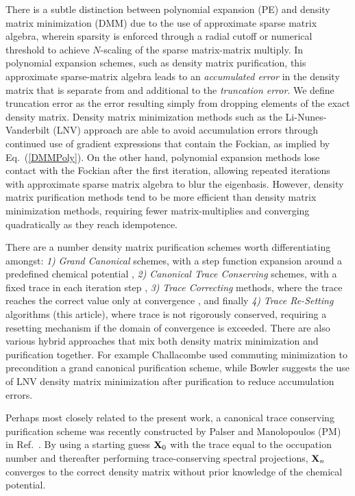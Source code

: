 \commentoutA{\documentclass[prl,aps,twocolumn,showpacs,twocolumngrid,superbib]{revtex4}}
\begin{document}
There is a subtle distinction between polynomial expansion (PE) and density 
matrix minimization (DMM) due to the use of approximate sparse matrix algebra, wherein
sparsity is enforced through a radial cutoff or numerical threshold  to 
achieve $N$-scaling of the sparse matrix-matrix multiply. In polynomial expansion schemes, 
such as density matrix purification, 
this approximate sparse-matrix algebra leads to an {\em accumulated error} in the density matrix 
that is separate from and additional to the {\em truncation error}.  We define truncation error as the 
error resulting simply from dropping elements of the exact density matrix.  Density matrix 
minimization methods such as the Li-Nunes-Vanderbilt \cite{XLi93,DBowler99} (LNV) approach are able to 
avoid accumulation errors through continued use of gradient expressions that contain the Fockian, 
as implied by Eq.~(\ref{DMMPoly}). On the other hand, polynomial expansion methods lose contact 
with the Fockian after the first iteration, allowing repeated iterations with 
approximate sparse matrix algebra to blur the eigenbasis.  However, density matrix purification 
methods tend to be more efficient than density matrix minimization methods, requiring fewer 
matrix-multiplies and converging quadratically as they reach idempotence.

There are a number density matrix purification schemes worth differentiating amongst: 
{\it 1)} {\it Grand Canonical} schemes, with a step function  expansion around a predefined 
         chemical potential \cite{RMcWeeny60,APalser99,AHolas01,ANiklasson02A,ANiklasson02B},
{\it 2)} {\it Canonical Trace Conserving} schemes, with a fixed trace
         in each iteration step \cite{APalser99}, 
{\it 3)} {\it Trace Correcting} methods, where the trace reaches the correct value only at 
         convergence \cite{ANiklasson02A}, and finally 
{\it 4)} {\it Trace Re-Setting} algorithms (this article), where trace is not rigorously conserved,
          requiring a resetting  mechanism if the domain of convergence is exceeded.
There are also various hybrid approaches that mix both density matrix minimization and 
purification together.  For example Challacombe\cite{MChallacombe99} used  commuting 
minimization  to precondition a grand canonical purification scheme,
while Bowler \cite{DBowler99} suggests the use of LNV density matrix minimization 
after purification to reduce accumulation errors.

Perhaps most closely related to the present work, a canonical trace 
conserving purification scheme was recently constructed by Palser and Manolopoulos 
(PM) in Ref.~. 
By using a starting guess ${\bf X}_0$ with the trace equal to 
the occupation number and thereafter performing trace-conserving
spectral projections, ${\bf X}_n$ converges to the correct density matrix without
prior knowledge of the chemical potential. 
\end{document}
